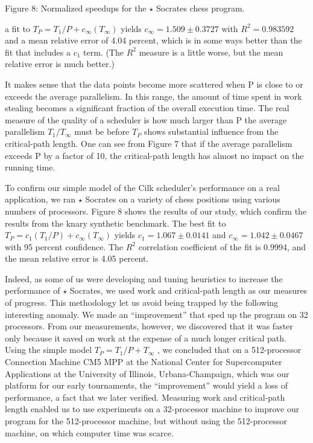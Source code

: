 \documentclass[
]{article}
\begin{document}
Figure 8: Normalized speedups for the \(\star\) Socrates chess program.

a fit to \(T_{P} = T_{1}/P + c_{\infty}(T_{\infty})\) yields
\(c_{\infty} = 1.509 \pm 0.3727\) with \(R^{2} = 0.983592\) and a mean
relative error of 4.04 percent, which is in some ways better than the
fit that includes a \(c_{1}\) term. (The \(R^{2}\) measure is a little
worse, but the mean relative error is much better.)

It makes sense that the data points become more scattered when P is
close to or exceeds the average parallelism. In this range, the amount
of time spent in work stealing becomes a significant fraction of the
overall execution time. The real measure of the quality of a scheduler
is how much larger than P the average parallelism \(T_{1}/T_{\infty}\)
must be before \(T_{P}\) shows substantial influence from the
critical-path length. One can see from Figure 7 that if the average
parallelism exceeds P by a factor of 10, the critical-path length has
almost no impact on the running time.

To confirm our simple model of the Cilk scheduler's performance on a
real application, we ran \(\star\) Socrates on a variety of chess
positions using various numbers of processors. Figure 8 shows the
results of our study, which confirm the results from the knary synthetic
benchmark. The best fit to
\(T_{P} = c_{1}(T_{1} / P) + c_{\infty}(T_{\infty})\) yields
\(c_{1} = 1.067 \pm 0.0141\) and \(c_{\infty} = 1.042 \pm 0.0467\) with
95 percent confidence. The \(R^{2}\) correlation coefficient of the fit
is 0.9994, and the mean relative error is 4.05 percent.

Indeed, as some of us were developing and tuning heuristics to increase
the performance of \(\star\) Socrates, we used work and critical-path
length as our measures of progress. This methodology let us avoid being
trapped by the following interesting anomaly. We made an ``improvement''
that sped up the program on 32 processors. From our measurements,
however, we discovered that it was faster only because it saved on work
at the expense of a much longer critical path. Using the simple model
\(T_{P} = T_{1} / P + T_{\infty}\) , we concluded that on a
512-processor Connection Machine CM5 MPP at the National Center for
Supercomputer Applications at the University of Illinois,
Urbana-Champaign, which was our platform for our early tournaments, the
``improvement'' would yield a loss of performance, a fact that we later
verified. Measuring work and critical-path length enabled us to use
experiments on a 32-processor machine to improve our program for the
512-processor machine, but without using the 512-processor machine, on
which computer time was scarce.
\end{document}
